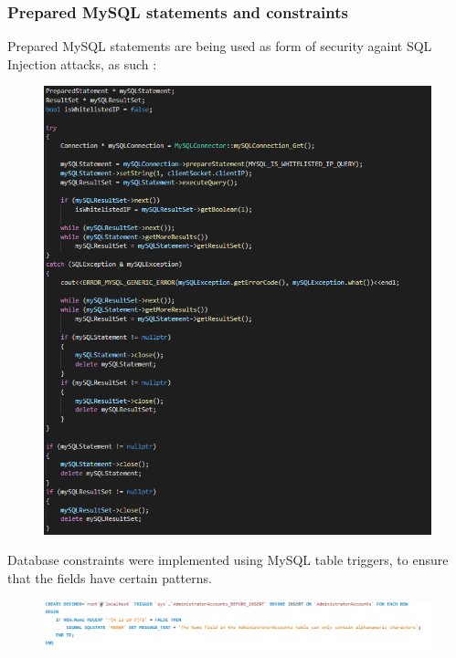 \documentclass[runningheads]{llncs}
\begin{document}
\subsubsection{Prepared MySQL statements and constraints}
Prepared MySQL statements are being used as form of security againt SQL Injection attacks, as such :\\
\begin{figure}[H]
\centering
\includegraphics[width=150mm]{MySQL_Prepared_Statements.png}
\end{figure}

Database constraints were implemented using MySQL table triggers, to ensure that the fields have certain patterns.\\
\begin{figure}[H]
\centering
\includegraphics[width=150mm]{MySQL_Table_Triggers.png}
\end{figure}
\end{document}

